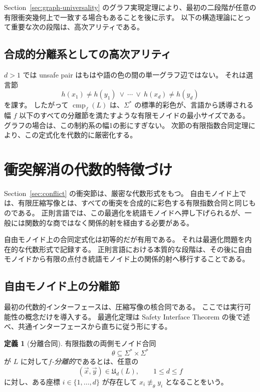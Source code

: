 \documentclass[10pt,a4paper]{ltjsarticle}
\theoremstyle{definition}
\newtheorem{definition}[theorem]{定義}
\theoremstyle{remark}
\newcommand{\cmp}{\operatorname{cmp}}
\begin{document}
Section~\ref{sec:graph-universality} のグラフ実現定理により、最初の二段階が任意の有限衝突幾何上で一致する場合もあることを後に示す。
以下の構造理論にとって重要な次の段階は、高次アリティである。

\subsection{合成的分離系としての高次アリティ}

$d>1$ では unsafe pair はもはや語の色の間の単一グラフ辺ではない。
それは選言節
\[
h(x_1)\neq h(y_1)
\ \vee\ \cdots\ \vee\
h(x_d)\neq h(y_d)
\]
を課す。
したがって $\cmp_f(L)$ は、$\Sigma^*$ の標準的彩色が、言語から誘導される幅 $f$ 以下のすべての分離節を満たすような有限モノイドの最小サイズである。
グラフの場合は、この制約系の幅1の影にすぎない。
次節の有限指数合同定理により、この定式化を代数的に厳密化する。

\section{衝突解消の代数的特徴づけ}
\label{sec:algebraic-conflict}

Section~\ref{sec:conflict} の衝突節は、厳密な代数形式をもつ。
自由モノイド上では、有限圧縮写像とは、すべての衝突を合成的に彩色する有限指数合同と同じものである。
正則言語では、この最適化を統語モノイドへ押し下げられるが、一般には関数的な商ではなく関係的射を経由する必要がある。

自由モノイド上の合同定式化は初等的だが有用である。
それは最適化問題を内在的な代数形式で記録する。
正則言語における本質的な段階は、その後に自由モノイドから有限の点付き統語モノイド上の関係的射へ移行することである。

\subsection{自由モノイド上の分離節}

最初の代数的インターフェースは、圧縮写像の核合同である。
ここでは実行可能性の概念だけを導入する。
最適化定理は Safety Interface Theorem の後で述べ、共通インターフェースから直ちに従う形にする。

\begin{definition}[分離合同]
有限指数の両側モノイド合同
\[
\theta\subseteq\Sigma^*\times\Sigma^*
\]
が $L$ に対して\emph{$f$-分離的}であるとは、任意の
\[
(\vec x,\vec y)\in\mathfrak U_d(L),
\qquad
1\le d\le f
\]
に対し、ある座標 $i\in\{1,\ldots,d\}$ が存在して
$x_i\not\equiv_\theta y_i$
となることをいう。
\end{definition}
\end{document}
